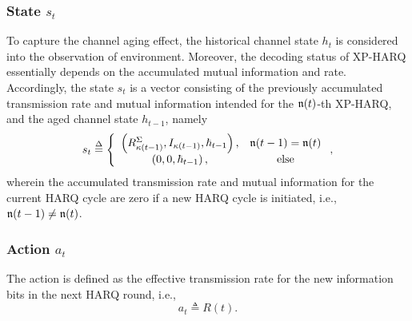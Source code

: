 \documentclass[lettersize,journal]{IEEEtran}
\begin{document}
\subsubsection{State $s_t$}
To capture the channel aging effect, the historical channel state ${h}_{t}$ is considered into the observation of environment. Moreover, the decoding status of XP-HARQ essentially depends on the accumulated mutual information and rate. Accordingly, the state $s_t$ is a vector consisting of the previously accumulated transmission rate and mutual information intended for the $\frak{n}(t)$-th XP-HARQ, and the aged channel state ${h}_{t-1}$, namely %
    \begin{equation}\label{eqn:state}
    {s_t} \buildrel \Delta \over = \left\{ {\begin{array}{*{20}{c}}
{\left( {R_{\kappa (t - 1)}^\Sigma ,{I_{\kappa (t - 1)}},{\hbar_{t - 1}}} \right),}&\frak{n}(t-1)=\frak{n}(t)\\
{\left( {0,0,{\hbar_{t - 1}}} \right),}&{\rm else}
\end{array}} \right.,
    \end{equation}
    wherein the accumulated transmission rate and mutual information for the current HARQ cycle are zero if a new HARQ cycle is initiated, i.e., $\frak{n}(t-1)\ne \frak{n}(t)$.
\subsubsection{Action $a_t$} %
The action is defined as the effective transmission rate for the new information bits in the next HARQ round, i.e.,
    \begin{equation}\label{eqn:action}
    {a}_{t} \triangleq {R{(t)}}.
    \end{equation}
\end{document}
